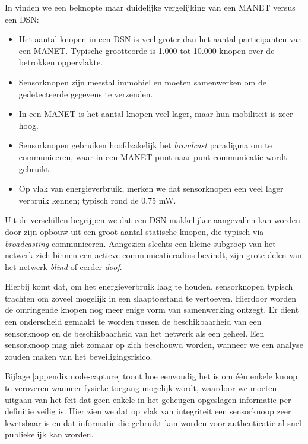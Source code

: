 In \citep{garg2010mobile} vinden we een beknopte maar duidelijke vergelijking
van een MANET versus een DSN:

\begin{itemize}

  \item Het aantal knopen in een DSN is veel groter dan het aantal
  participanten van een MANET. Typische grootteorde is 1.000 tot 10.000 knopen
  over de betrokken oppervlakte.

  \item Sensorknopen zijn meestal immobiel en moeten samenwerken om de
  gedetecteerde gegevens te verzenden.

  \item In een MANET is het aantal knopen veel lager, maar hun mobiliteit is
  zeer hoog.

  \item Sensorknopen gebruiken hoofdzakelijk het \emph{broadcast} paradigma om
  te communiceren, waar in een MANET punt-naar-punt communicatie wordt gebruikt.

  \item Op vlak van energieverbruik, merken we dat sensorknopen een veel lager
  verbruik kennen; typisch rond de 0,75 mW.

\end{itemize}

Uit de verschillen begrijpen we dat een DSN makkelijker aangevallen kan worden
door zijn opbouw uit een groot aantal statische knopen, die typisch via
\emph{broadcasting} communiceren. Aangezien slechts een kleine subgroep van het
netwerk zich binnen een actieve communicatieradius bevindt, zijn grote delen
van het netwerk \emph{blind} of eerder \emph{doof}.

Hierbij komt dat, om het energieverbruik laag te houden, sensorknopen typisch
trachten om zoveel mogelijk in een slaaptoestand te vertoeven. Hierdoor worden
de omringende knopen nog meer enige vorm van samenwerking ontzegt. Er dient een
onderscheid gemaakt te worden tussen de beschikbaarheid van een sensorknoop en
de beschikbaarheid van het netwerk als een geheel. Een sensorknoop mag niet
zomaar op zich beschouwd worden, wanneer we een analyse zouden maken van het
beveiligingsrisico.

Bijlage \ref{appendix:node-capture} toont hoe eenvoudig het is om \'e\'en
enkele knoop te veroveren wanneer fysieke toegang mogelijk wordt, waardoor we
moeten uitgaan van het feit dat geen enkele in het geheugen opgeslagen
informatie per definitie veilig is. Hier zien we dat op vlak van integriteit
een sensorknoop zeer kwetsbaar is en dat informatie die gebruikt kan worden
voor authenticatie al snel publiekelijk kan worden.

